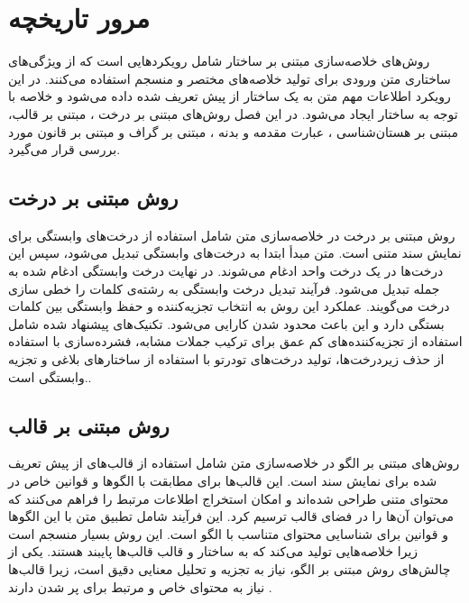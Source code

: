 \chapter{مرور تاریخچه}

روش‌های خلاصه‌سازی مبتنی بر ساختار شامل رویکردهایی است که از ویژگی‌های ساختاری متن ورودی برای تولید خلاصه‌های مختصر و منسجم استفاده می‌کنند. در این رویکرد اطلاعات مهم متن به یک ساختار از پیش تعریف شده داده می‌شود و خلاصه با توجه به ساختار ایجاد می‌شود. در این فصل روش‌های مبتنی بر درخت 
، مبتنی بر قالب،
مبتنی بر هستان‌شناسی
، عبارت مقدمه و بدنه
، مبتنی بر گراف
و مبتنی بر قانون
مورد بررسی قرار می‌گیرد. 

\section{روش مبتنی بر درخت}
روش مبتنی بر درخت در خلاصه‌سازی متن شامل استفاده از درخت‌های وابستگی برای نمایش سند متنی است. متن مبدأ ابتدا به درخت‌های وابستگی تبدیل می‌شود، سپس این درخت‌ها در یک درخت واحد ادغام می‌شوند. در نهایت درخت وابستگی ادغام شده به جمله‌ تبدیل می‌شود. فرآیند تبدیل درخت وابستگی به رشته‌ی کلمات را خطی سازی درخت می‌گویند. عملکرد این روش به انتخاب تجزیه‌کننده و حفظ وابستگی بین کلمات بستگی دارد و این باعث محدود شدن کارایی می‌شود. تکنیک‌های پیشنهاد شده شامل استفاده از تجزیه‌کننده‌های کم عمق برای ترکیب جملات مشابه، فشرده‌سازی با استفاده از حذف زیردرخت‌ها، تولید درخت‌های تودرتو با استفاده از ساختارهای بلاغی و تجزیه وابستگی است.\cite{andhale2016overview}.

\section{روش مبتنی بر قالب}
روش‌های مبتنی بر الگو در خلاصه‌سازی متن شامل استفاده از قالب‌های از پیش تعریف شده برای نمایش سند است. این قالب‌ها برای مطابقت با الگوها و قوانین خاص در محتوای متنی طراحی شده‌اند و امکان استخراج اطلاعات مرتبط را فراهم می‌کنند که می‌توان آن‌ها را در فضای قالب ترسیم کرد. این فرآیند شامل تطبیق متن با این الگوها و قوانین برای شناسایی محتوای متناسب با الگو است. این روش بسیار منسجم است زیرا خلاصه‌هایی تولید می‌کند که به ساختار و قالب قالب‌ها پایبند هستند. یکی از چالش‌های روش‌ مبتنی بر الگو، نیاز به تجزیه و تحلیل معنایی دقیق است، زیرا قالب‌ها نیاز به محتوای خاص و مرتبط برای پر شدن دارند
\cite{andhale2016overview}.
